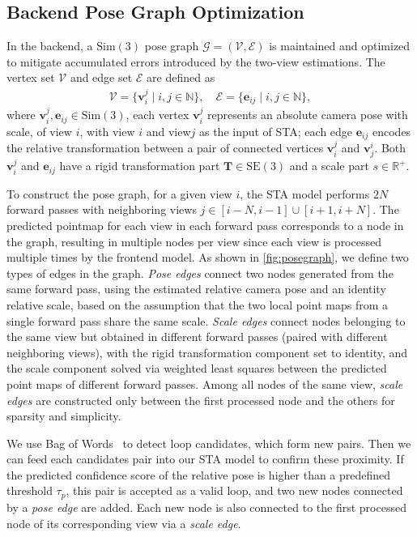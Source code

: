 \subsection{Backend Pose Graph Optimization}
\label{subsec:backend}
 In the backend, a $\mathrm{Sim}(3)$ pose graph $\mathcal{G} = (\mathcal{V}, \mathcal{E})$ is maintained and optimized to mitigate accumulated errors introduced by the two-view estimations. The vertex set $\mathcal{V}$ and edge set $\mathcal{E}$ are defined as
\begin{align}
    \mathcal{V} = \{\bm v_i^j\mid i,j \in\mathbb{N} \}, \quad
    \mathcal{E} = \{\bm e_{ij} \mid i,j\in\mathbb{N} \},
\end{align}
 where $\bm v_i^j,\bm e_{ij} \in \mathrm{Sim}(3)$, each vertex $\bm v_i^j$ represents an absolute camera pose with scale, of view $i$, with view $i$ and view$j$ as the input of STA; each edge $\bm e_{ij}$ encodes the relative transformation between a pair of connected vertices $\bm v_i^j$ and $\bm v_j^i$.
 Both $\bm v_i^j$ and $\bm e_{ij}$ have a rigid transformation part $\bm T\in \mathrm{SE}(3)$  and a scale part $s\in\mathbb{R}^+$.

To construct the pose graph, for a given view $i$, the STA model performs $2N$ forward passes with neighboring views $j \in [i-N, i-1] \cup [i+1, i+N]$. The predicted pointmap for each view in each forward pass corresponds to a node in the graph, resulting in multiple nodes per view since each view is processed multiple times by the frontend model.
As shown in \cref{fig:posegraph}, we define two types of edges in the graph. \textit{Pose edges} connect two nodes generated from the same forward pass, using the estimated relative camera pose and an identity relative scale, based on the assumption that the two local point maps from a single forward pass share the same scale. \textit{Scale edges} connect nodes belonging to the same view but obtained in different forward passes (paired with different neighboring views), with the rigid transformation component set to identity, and the scale component solved via weighted least squares between the predicted point maps of different forward passes.
Among all nodes of the same view, \textit{scale edges} are constructed only between the first processed node and the others for sparsity and simplicity.

 We use Bag of Words~\cite{GalvezTRO12} to detect loop candidates, which form new pairs. Then we can feed each candidates pair into our STA model to confirm these proximity. If the predicted confidence score of the relative pose is higher than a predefined threshold $\tau_p$, this pair is accepted as a valid loop, and two new nodes connected by a \textit{pose edge} are added. Each new node is also connected to the first processed node of its corresponding view via a \textit{scale edge}.







